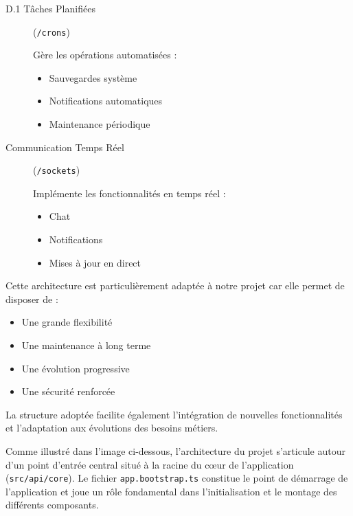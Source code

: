 \begin{enumerate}
\begin{description}
        \begin{description}
            \item[D.1 Tâches Planifiées] (\verb|/crons|) 
                
            Gère les opérations automatisées :

            \begin{itemize}
                \item Sauvegardes système
                \item Notifications automatiques
                \item Maintenance périodique
            \end{itemize}

            \item[Communication Temps Réel]  (\verb|/sockets|) 

            Implémente les fonctionnalités en temps réel :

            \begin{itemize}
                \item Chat
                \item Notifications
                \item Mises à jour en direct
            \end{itemize}
        \end{description}
Cette architecture est particulièrement adaptée à notre projet car elle permet de disposer de : 

\begin{itemize}
    
    \item Une grande flexibilité
\item Une maintenance à long terme
\item Une évolution progressive
\item Une sécurité renforcée 
\end{itemize}

\vspace{0.35cm}
    
La structure adoptée facilite également l'intégration de nouvelles fonctionnalités et l'adaptation aux évolutions des besoins métiers.

\end{description}

Comme illustré dans l'image ci-dessous, l'architecture du projet s'articule autour d'un point d'entrée central situé à la racine du cœur de l'application (\verb|src/api/core|). Le fichier \verb|app.bootstrap.ts| constitue le point de démarrage de l'application et joue un rôle fondamental dans l'initialisation et le montage des différents composants.


\end{enumerate}
